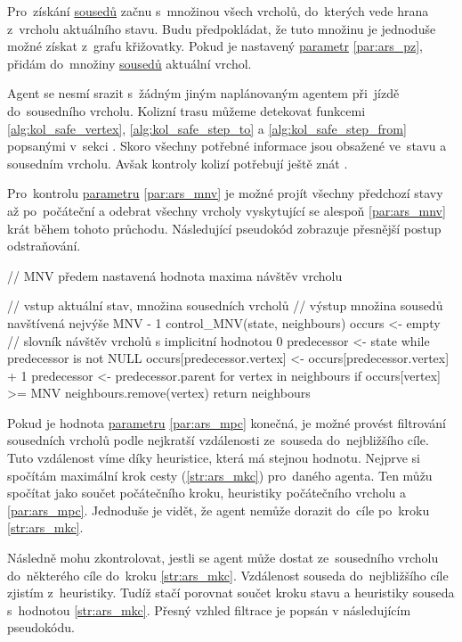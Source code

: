 Pro~získání \hyperref[str:ars_sousedi]{sousedů} začnu s~množinou všech vrcholů,
do~kterých vede hrana z~vrcholu aktuálního stavu.
Budu předpokládat, že tuto množinu je jednoduše možné získat z~grafu křižovatky.
Pokud je nastavený \hyperref[subsubsec:ars_parametry]{parametr} \ref{par:ars_pz},
přidám do~množiny \hyperref[str:ars_sousedi]{sousedů} aktuální vrchol.

Agent se nesmí srazit s~žádným jiným naplánovaným agentem při~jízdě do~sousedního vrcholu.
Kolizní trasu můžeme detekovat funkcemi \ref{alg:kol_safe_vertex}, \ref{alg:kol_safe_step_to}
a \ref{alg:kol_safe_step_from} popsanými v~sekci .
Skoro všechny potřebné informace jsou obsažené ve~stavu a sousedním vrcholu.
Avšak kontroly kolizí potřebují ještě znát .

Pro~kontrolu \hyperref[subsubsec:ars_parametry]{parametru} \ref{par:ars_mnv}
je možné projít všechny předchozí stavy až po~počáteční
a odebrat všechny vrcholy vyskytující se alespoň \ref{par:ars_mnv} krát během tohoto průchodu.
Následující pseudokód zobrazuje přesnější postup odstraňování.

\begin{code}[fontsize=\footnotesize]
// MNV předem nastavená hodnota maxima návštěv vrcholu

// vstup aktuální stav, množina sousedních vrcholů
// výstup množina sousedů navštívená nejvýše MNV - 1
control_MNV(state, neighbours)
  occurs <- empty // slovník návštěv vrcholů s implicitní hodnotou 0
  predecessor <- state
  while predecessor is not NULL
    occurs[predecessor.vertex] <- occurs[predecessor.vertex] + 1
    predecessor <- predecessor.parent
  for vertex in neighbours
    if occurs[vertex] >= MNV
      neighbours.remove(vertex)
  return neighbours
\end{code}

Pokud je hodnota \hyperref[subsubsec:ars_parametry]{parametru} \ref{par:ars_mpc} konečná,
je možné provést filtrování sousedních vrcholů podle nejkratší vzdálenosti ze~souseda do~nejbližšího cíle.
Tuto vzdálenost víme díky heuristice, která má stejnou hodnotu.
Nejprve si spočítám maximální krok cesty (\ref{str:ars_mkc}) pro~daného agenta.
Ten můžu spočítat jako součet počátečního kroku, heuristiky počátečního vrcholu a \ref{par:ars_mpc}.
Jednoduše je vidět, že agent nemůže dorazit do~cíle po~kroku \ref{str:ars_mkc}.

Následně mohu zkontrolovat, jestli se agent může dostat ze~sousedního vrcholu
do~některého cíle do~kroku \ref{str:ars_mkc}.
Vzdálenost souseda do~nejbližšího cíle zjistím z~heuristiky.
Tudíž stačí porovnat součet kroku stavu a heuristiky souseda s~hodnotou \ref{str:ars_mkc}.
Přesný vzhled filtrace je popsán v následujícím pseudokódu.

